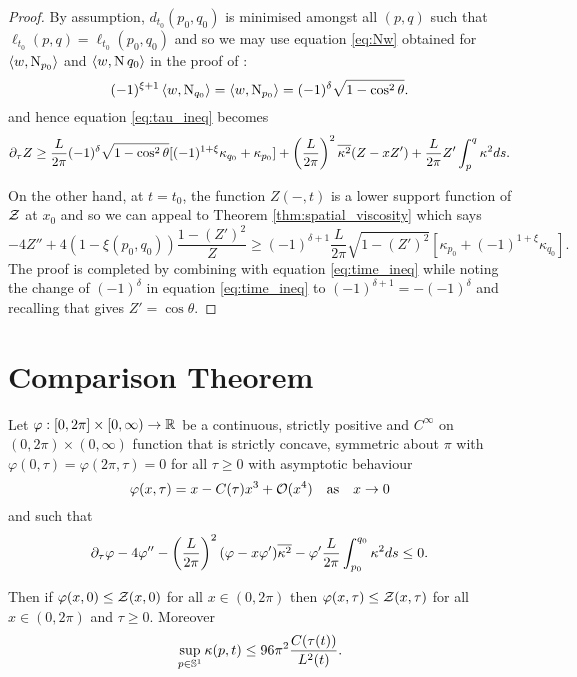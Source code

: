 \documentclass[a4paper, 12pt]{amsart}
\begin{document}
\begin{proof}
By assumption, \(d_{t_0} (p_0, q_0)\) is minimised amongst all \((p, q)\) such that \(\ell_{t_0}(p, q) = \ell_{t_0}(p_0, q_0)\) and so we may use equation \eqref{eq:Nw} obtained for $\inpr{w}{\nor_{p_0}}$ and $\inpr{w}{\nor{q_0}}$ in the proof of :
\[
(-1)^{\xi+1} \inpr{w}{\nor_{q_0}} = \inpr{w}{\nor_{p_0}} =  (-1)^\delta \sqrt{1-\cos^2\theta}.
\]
and hence equation \eqref{eq:tau_ineq} becomes
\begin{equation}
\label{eq:time_ineq}
\partial_{\tau} Z \geq \frac{L}{2\pi} (-1)^\delta \sqrt{1-\cos^2\theta} [(-1)^{1+\xi}\kappa_{q_0} + \kappa_{p_0}] + \left(\frac{L}{2\pi}\right)^2 \avg{\kappa^2} (Z - x Z') + \frac{L}{2\pi} Z' \int_p^q \kappa^2 ds.
\end{equation}

On the other hand, at $t=t_0$, the function $Z(-, t)$ is a lower support function of $\chordarcprofile$ at $x_0$ and so we can appeal to Theorem \ref{thm:spatial_viscosity} which says
\[
-4Z'' + 4(1-\xi(p_0,q_0)) \frac{1 - (Z')^2}{Z} \geq (-1)^{\delta+1} \frac{L}{2\pi} \sqrt{1 - (Z')^2} \left[\kappa_{p_0} + (-1)^{1+\xi} \kappa_{q_0}\right].
\]
The proof is completed by combining with equation \eqref{eq:time_ineq} while noting the change of \((-1)^{\delta}\) in equation \eqref{eq:time_ineq} to \((-1)^{\delta + 1} = -(-1)^{\delta}\) and recalling that  gives \(Z' = \cos\theta\).
\end{proof}

\section{Comparison Theorem}
\label{sec:comparison}

\begin{thm}
\label{thm:comparison}
Let \(\varphi : [0, 2\pi] \times [0, \infty) \to \R\) be a continuous, strictly positive and \(C^{\infty}\) on \((0, 2\pi) \times (0, \infty)\) function that is strictly concave, symmetric about \(\pi\) with \(\varphi(0, \tau) = \varphi(2\pi, \tau) = 0\) for all \(\tau \geq 0\) with asymptotic behaviour
\[
\varphi(x, \tau) = x - C(\tau) x^3 + \bigo(x^4)  \quad \text{as} \quad x \to 0
\]
and such that
\[
\partial_{\tau} \varphi - 4 \varphi'' - \left(\frac{L}{2\pi}\right)^2 (\varphi - x \varphi') \avg{\kappa^2} - \varphi' \frac{L}{2\pi} \int_{p_0}^{q_0} \kappa^2 ds \leq 0.
\]

Then if \(\varphi (x, 0) \leq \chordarcprofile(x, 0)\) for all \(x \in (0, 2\pi)\) then \(\varphi (x, \tau) \leq \chordarcprofile(x, \tau)\) for all \(x \in (0, 2\pi)\) and \(\tau \geq 0\). Moreover
\[
\sup_{p \in \S^1} \kappa(p, t) \leq 96 \pi^2 \frac{C(\tau(t))}{L^2(t)}.
\]
\end{thm}
\end{document}

